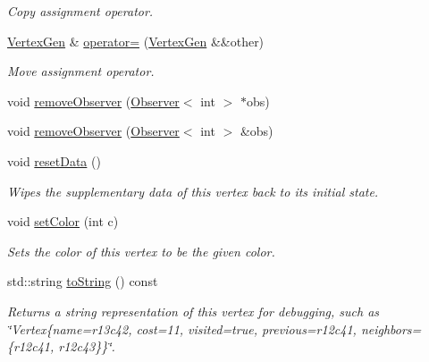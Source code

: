 \begin{DoxyCompactItemize}
\begin{DoxyCompactList}\small\item\em Copy assignment operator. \end{DoxyCompactList}\item 
\mbox{\hyperlink{classVertexGen}{Vertex\+Gen}} \& \mbox{\hyperlink{classVertexGen_afa38659fe8bf4a66b0e3f7c4d37f347f}{operator=}} (\mbox{\hyperlink{classVertexGen}{Vertex\+Gen}} \&\&other)
\begin{DoxyCompactList}\small\item\em Move assignment operator. \end{DoxyCompactList}\item 
void \mbox{\hyperlink{classObservable_a2fbb493a74c7c4a7604326bffcd75dbd}{remove\+Observer}} (\mbox{\hyperlink{classObserver}{Observer}}$<$ int $>$ $\ast$obs)
\item 
void \mbox{\hyperlink{classObservable_a36b9c4607c1cab08dc800daa5aa38b82}{remove\+Observer}} (\mbox{\hyperlink{classObserver}{Observer}}$<$ int $>$ \&obs)
\item 
void \mbox{\hyperlink{classVertexGen_ab51301d11ddc80165b3b7798b866421e}{reset\+Data}} ()
\begin{DoxyCompactList}\small\item\em Wipes the supplementary data of this vertex back to its initial state. \end{DoxyCompactList}\item 
void \mbox{\hyperlink{classVertexGen_a5551ca73ea9118c8dc6dbfd26e72e3d6}{set\+Color}} (int c)
\begin{DoxyCompactList}\small\item\em Sets the color of this vertex to be the given color. \end{DoxyCompactList}\item 
std\+::string \mbox{\hyperlink{classVertexGen_a1fe5121d6528fdea3f243321b3fa3a49}{to\+String}} () const
\begin{DoxyCompactList}\small\item\em Returns a string representation of this vertex for debugging, such as \char`\"{}\+Vertex\{name=r13c42, cost=11, visited=true, previous=r12c41, neighbors=\{r12c41, r12c43\}\}\char`\"{}. \end{DoxyCompactList}\end{DoxyCompactItemize}
